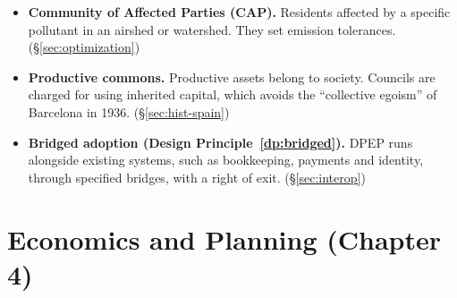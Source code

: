 \documentclass[10pt,twoside,openany]{book}
\theoremstyle{dpepstyle}
\begin{document}
\begin{itemize}[leftmargin=1.2em,itemsep=2pt,topsep=2pt]
\item \textbf{Community of Affected Parties (CAP).} Residents affected by a specific pollutant in an airshed or watershed. They set emission tolerances. (\S\ref{sec:optimization})
\item \textbf{Productive commons.} Productive assets belong to society. Councils are charged for using inherited capital, which avoids the ``collective egoism'' of Barcelona in 1936. (\S\ref{sec:hist-spain})
\item \textbf{Bridged adoption (Design Principle~\ref{dp:bridged}).} DPEP runs alongside existing systems, such as bookkeeping, payments and identity, through specified bridges, with a right of exit. (\S\ref{sec:interop})
\end{itemize}


\section*{Economics and Planning (Chapter 4)}
\end{document}
